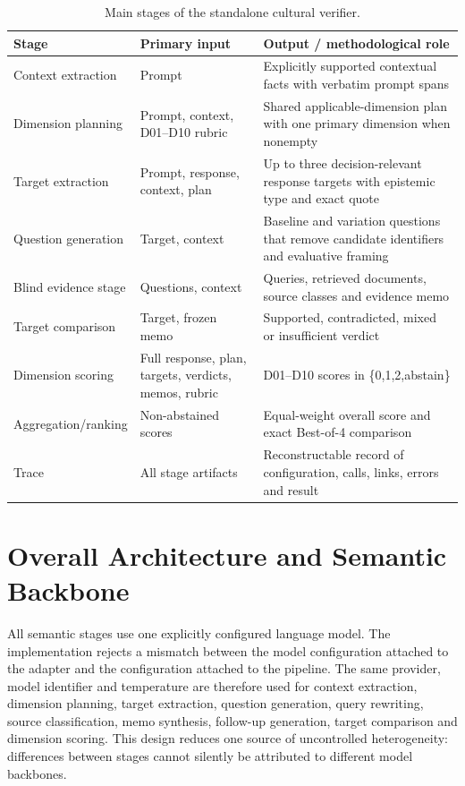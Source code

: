 \begin{table}[htbp]
\centering
\footnotesize
\setlength{\tabcolsep}{3pt}
\renewcommand{\arraystretch}{1.08}
\caption{Main stages of the standalone cultural verifier.}
\label{tab:verifier-stages}
\begin{tabular}{p{3.2cm}p{4.4cm}p{5.7cm}}
\toprule
\textbf{Stage} & \textbf{Primary input} & \textbf{Output / methodological role} \\
\midrule
Context extraction & Prompt & Explicitly supported contextual facts with verbatim prompt spans \\
Dimension planning & Prompt, context, D01--D10 rubric & Shared applicable-dimension plan with one primary dimension when nonempty \\
Target extraction & Prompt, response, context, plan & Up to three decision-relevant response targets with epistemic type and exact quote \\
Question generation & Target, context & Baseline and variation questions that remove candidate identifiers and evaluative framing \\
Blind evidence stage & Questions, context & Queries, retrieved documents, source classes and evidence memo \\
Target comparison & Target, frozen memo & Supported, contradicted, mixed or insufficient verdict \\
Dimension scoring & Full response, plan, targets, verdicts, memos, rubric & D01--D10 scores in \{0,1,2,abstain\} \\
Aggregation/ranking & Non-abstained scores & Equal-weight overall score and exact Best-of-4 comparison \\
Trace & All stage artifacts & Reconstructable record of configuration, calls, links, errors and result \\
\bottomrule
\end{tabular}
\end{table}

\section{Overall Architecture and Semantic Backbone}
\label{sec:overall-architecture}

All semantic stages use one explicitly configured language model. The implementation rejects a mismatch between the model configuration attached to the adapter and the configuration attached to the pipeline. The same provider, model identifier and temperature are therefore used for context extraction, dimension planning, target extraction, question generation, query rewriting, source classification, memo synthesis, follow-up generation, target comparison and dimension scoring. This design reduces one source of uncontrolled heterogeneity: differences between stages cannot silently be attributed to different model backbones.

